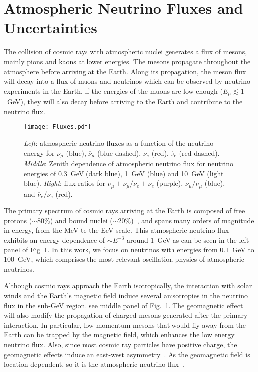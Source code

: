 \section{Atmospheric Neutrino Fluxes and Uncertainties}\label{sec:FluxUncertainties}

The collision of cosmic rays with atmospheric nuclei generates a
flux of mesons, mainly pions and kaons at lower energies.
The mesons propagate
throughout the atmosphere before arriving at the Earth. 
Along its
propagation, the meson flux will decay into a flux of muons and
neutrinos which can be observed by neutrino experiments in the Earth. 
If the
energies of the muons are low enough ($E_{\mu} \lesssim1$~GeV), they
will also decay before arriving to the Earth and contribute to the
neutrino flux.


\begin{figure}[b]
\begin{center}
\texttt{[image: Fluxes.pdf]}
\caption{\emph{Left}: atmospheric neutrino fluxes as a function of the neutrino energy for $\nu_\mu$ (blue), $\overline\nu_\mu$ (blue dashed), $\nu_e$ (red), $\overline\nu_e$ (red dashed). \emph{Middle}: Zenith dependence of atmospheric neutrino flux for neutrino energies of 0.3~GeV (dark blue), 1~GeV (blue) and 10~GeV (light blue). \emph{Right}: flux ratios for $\nu_\mu+\overline\nu_\mu/\nu_e+\overline\nu_e$ (purple), $\overline\nu_\mu/\nu_\mu$ (blue), and $\overline\nu_e/\nu_e$ (red).\label{fig:Flux}}
\end{center}
\end{figure}
The primary spectrum of cosmic rays arriving at the Earth is composed of free protons ($\sim 80\%$) and bound nuclei ($\sim20\%$)~\cite{Gaisser:2002jj,Dembinski:2017zsh}, and spans many orders of magnitude in energy, from the MeV to the EeV scale.
This atmospheric neutrino flux exhibits an energy dependence of  $\sim E^{-3}$ around $1$~GeV as can be seen in the left panel of Fig~\ref{fig:Flux}. 
In this work, we focus on neutrinos with
energies from $0.1$~GeV to $100$~GeV, which comprises the
most relevant oscillation physics of atmospheric neutrinos.


Although cosmic rays approach the Earth isotropically, the
interaction with solar winds and the Earth's magnetic field induce
several anisotropies in the neutrino flux in the sub-GeV region, see middle panel of 
Fig.~\ref{fig:Flux}. 
The geomagnetic
effect will also modify the propagation of charged mesons generated after the
primary interaction. 
In particular, low-momentum mesons that would fly away from the Earth can be trapped by the magnetic field, which
enhances
the low energy neutrino flux. 
Also, since most cosmic ray particles have positive charge, the geomagnetic effects induce an east-west
asymmetry~\cite{Super-Kamiokande:1999mpf}. 
As the geomagnetic field is location dependent, so it is the atmospheric neutrino flux~\cite{Honda:2015fha}.

